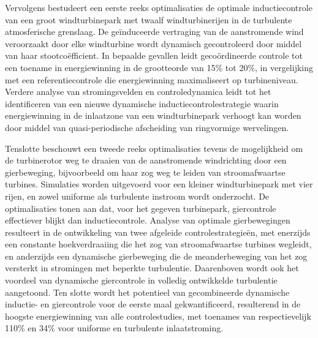 Vervolgens bestudeert een eerste reeks optimalisaties de optimale inductiecontrole van een groot windturbinepark met twaalf windturbinerijen in de turbulente atmosferische grenslaag. De ge\"induceerde vertraging van de aanstromende wind veroorzaakt door elke windturbine wordt dynamisch gecontroleerd door middel van haar stootco\"efficient. In bepaalde gevallen leidt geco\"ordineerde controle tot een toename in energiewinning in de grootteorde van 15\% tot 20\%, in vergelijking met een referentiecontrole die energiewinning maximaliseert op turbineniveau. Verdere analyse van stromingsvelden en controledynamica leidt tot het identificeren van een nieuwe dynamische inductiecontrolestrategie waarin energiewinning in de inlaatzone van een windturbinepark verhoogt kan worden door middel van quasi-periodische afscheiding van ringvormige wervelingen. 

Tenslotte beschouwt een tweede reeks optimalisaties tevens de mogelijkheid om de turbinerotor weg te draaien van de aanstromende windrichting door een gierbeweging, bijvoorbeeld om haar zog weg te leiden van stroomafwaartse turbines. Simulaties worden uitgevoerd voor een kleiner windturbinepark met vier rijen, en zowel uniforme als turbulente instroom wordt onderzocht. De optimalisaties tonen aan dat, voor het gegeven turbinepark, giercontrole effectiever blijkt dan inductiecontrole. Analyse van optimale gierbewegingen resulteert in de ontwikkeling van twee afgeleide controlestrategie\"en, met enerzijds een constante hoekverdraaiing die het zog van stroomafwaartse turbines wegleidt, en anderzijds een dynamische gierbeweging die de meanderbeweging van het zog versterkt in stromingen met beperkte turbulentie. Daarenboven wordt ook het voordeel van dynamische giercontrole in volledig ontwikkelde turbulentie aangetoond. Ten slotte wordt het potentieel van gecombineerde dynamische inductie- en giercontrole voor de eerste maal gekwantificeerd, resulterend in de hoogste energiewinning van alle controlestudies, met toenames van respectievelijk 110\% en 34\% voor uniforme en turbulente inlaatstroming. 
\cleardoublepage

